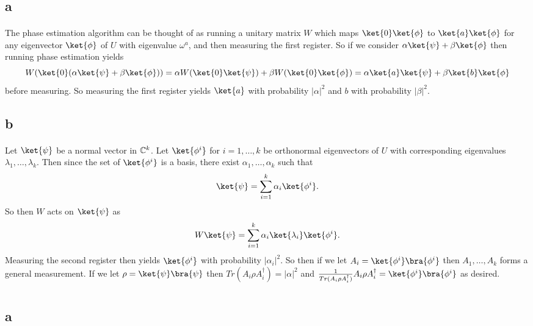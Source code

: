 \documentclass[letterpaper,12pt,oneside,onecolumn]{article}
\begin{document}
\section{}
\subsection{a}
\paragraph{}
The phase estimation algorithm can be thought of as running a unitary matrix $W$ which maps $\ket{0}\ket{\phi}$ to $\ket{a}\ket{\phi}$ for any eigenvector $\ket{\phi}$ of $U$ with eigenvalue $\omega^a$, and then measuring the first register. So if we consider $\alpha\ket{\psi} + \beta\ket{\phi}$ then running phase estimation yields
$$W(\ket{0}(\alpha\ket{\psi} + \beta\ket{\phi})) = \alpha W(\ket{0}\ket{\psi}) + \beta W(\ket{0}\ket{\phi}) = \alpha \ket{a}\ket{\psi} + \beta\ket{b}\ket{\phi}$$
before measuring. So measuring the first register yields $\ket{a}$ with probability $|\alpha|^2$ and $b$ with probability $|\beta|^2$.
\subsection{b}
\paragraph{}
Let $\ket{\psi}$ be a normal vector in $\mathbb{C}^k$. Let $\ket{\phi^i}$ for $i=1,\dots, k$ be orthonormal eigenvectors of $U$ with corresponding eigenvalues $\lambda_1, \dots, \lambda_k$. Then since the set of $\ket{\phi^i}$ is a basis, there exist $\alpha_1, \dots, \alpha_k$ such that
$$\ket{\psi} = \sum_{i=1}^k \alpha_i \ket{\phi^i}.$$
So then $W$ acts on $\ket{\psi}$ as
$$W\ket{\psi} = \sum_{i=1}^k \alpha_i \ket{\lambda_i}\ket{\phi^i}.$$
Measuring the second register then yields $\ket{\phi^i}$ with probability $|\alpha_i|^2$. So then if we let $A_i = \ket{\phi^i}\bra{\phi^i}$ then $A_1, \dots, A_k$ forms a general measurement. If we let $\rho = \ket{\psi}\bra{\psi}$ then $Tr(A_i\rho A_i^\dagger) = |\alpha|^2$ and $\frac{1}{Tr(A_i\rho A_i^\dagger)} A_i \rho A_i^\dagger = \ket{\phi^i}\bra{\phi^i}$ as desired.
\section{}
\subsection{a}
\end{document}
